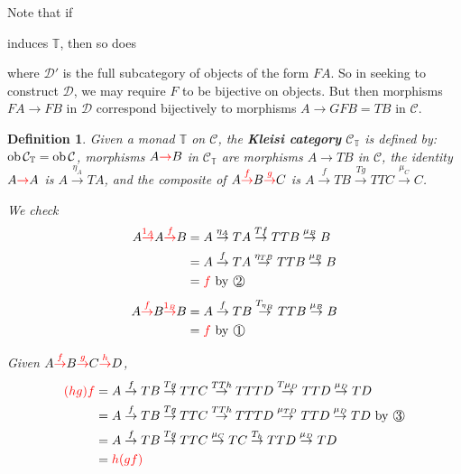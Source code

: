 \documentclass[a4paper]{article}
\newtheorem{definition}{Definition}
\numberwithin{definition}{section}
\newcommand*\ob[1]{\textnormal{ob}\,#1}
\newcommand*\circbox[1]{\raisebox{.5pt}{\textcircled{\raisebox{-.9pt} {#1}}}}
\begin{document}
Note that if
induces $\mathbb{T}$,
then so does
where $\mathcal{D}'$ is the full subcategory of objects of the form $FA$.
So in seeking to construct $\mathcal{D}$, we may require $F$ to be bijective on objects.
But then morphisms $FA \to FB$ in $\mathcal{D}$ correspond bijectively to morphisms $A \to GFB = TB$ in $\mathcal{C}$.

\begin{definition}
	Given a monad $\mathbb{T}$ on $\mathcal{C}$,
	the \textbf{Kleisi category} $\mathcal{C}_\mathbb{T}$ is defined by:
	$\ob \mathcal{C}_\mathbb{T} = \ob\mathcal{C}$,
	morphisms $A \textcolor{red}{\to} B$ in $\mathcal{C}_\mathbb{T}$ are morphisms $A \to TB$ in $\mathcal{C}$,
	the identity $A \textcolor{red}{\to} A$ is $A \overset{\eta_A}{\to} TA$,
	and the composite of $A \textcolor{red}{\overset{f}{\to}} B \textcolor{red}{\overset{g}{\to}} C$ is 
	$A \overset{f}{\to} TB \overset{Tg}{\to} TTC \overset{\mu_C}{\to} C$.
	
	We check
	\begin{align*}
	A \textcolor{red}{\overset{1_A}{\to}} A \textcolor{red}{\overset{f}{\to}} B &= A \overset{\eta_A}{\to} TA \overset{Tf}{\to} TTB \overset{\mu_B}{\to} B \\
	&= A \overset{f}{\to} TA \overset{\eta_{TB}}{\to} TTB \overset{\mu_B}{\to} B \\
	&= \textcolor{red}{f} \text{ by \textnormal{\circbox{2}}}
	\end{align*}
	\begin{align*}
	A \textcolor{red}{\overset{f}{\to}} B \textcolor{red}{\overset{1_B}{\to}} B &= A \overset{f}{\to} TB \overset{T_{\eta_B}}{\to} TTB \overset{\mu_B}{\to} B \\
	&= \textcolor{red}{f} \text{ by \textnormal{\circbox{1}}}
	\end{align*}

	Given $A\textcolor{red}{\overset{f}{\to}} B \textcolor{red}{\overset{g}{\to}} C \textcolor{red}{\overset{h}{\to}} D$,
	\begin{align*}
		\textcolor{red}{(hg)f} &= A \overset{f}{\to} TB \overset{Tg}{\to} TTC \overset{TTh}{\to} TTTD \overset{T\mu_D}{\to} TTD \overset{\mu_D}{\to} TD \\
		&= A \overset{f}{\to} TB \overset{Tg}{\to} TTC \overset{TTh}{\to} TTTD \overset{\mu_{TD}}{\to} TTD \overset{\mu_D}{\to} TD \text{ by \textnormal{\circbox{3}}} \\
		&= A \overset{f}{\to} TB \overset{Tg}{\to} TTC \overset{\mu_C}{\to} TC \overset{T_h}{\to} TTD \overset{\mu_D}{\to} TD \\
		&= \textcolor{red}{h(gf)}
	\end{align*}
\end{definition}
\end{document}
